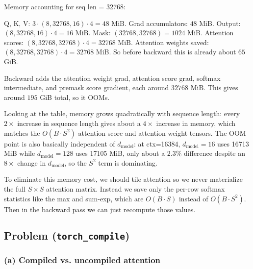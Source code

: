 \documentclass[11pt]{article}
\begin{document}
Memory accounting for seq len = 32768:

Q, K, V: $3 \cdot (8, 32768, 16) \cdot 4 = 48$ MiB.
Grad accumulators: $48$ MiB.
Output: $(8, 32768, 16) \cdot 4 = 16$ MiB.
Mask: $(32768, 32768) = 1024$ MiB.
Attention scores: $(8, 32768, 32768) \cdot 4 = 32768$ MiB.
Attention weights saved: $(8, 32768, 32768) \cdot 4 = 32768$ MiB.
So before backward this is already about $65$ GiB.

Backward adds the attention weight grad, attention score grad, softmax intermediate, and premask score gradient, each around $32768$ MiB. This gives around $195$ GiB total, so it OOMs.

Looking at the table, memory grows quadratically with sequence length: every $2\times$ increase in sequence length gives about a $4\times$ increase in memory, which matches the $O(B \cdot S^2)$ attention score and attention weight tensors. The OOM point is also basically independent of $d_{\text{model}}$: at ctx=16384, $d_{\text{model}}=16$ uses 16713 MiB while $d_{\text{model}}=128$ uses 17105 MiB, only about a 2.3\% difference despite an $8\times$ change in $d_{\text{model}}$, so the $S^2$ term is dominating.

To eliminate this memory cost, we should tile attention so we never materialize the full $S \times S$ attention matrix. Instead we save only the per-row softmax statistics like the max and sum-exp, which are $O(B \cdot S)$ instead of $O(B \cdot S^2)$. Then in the backward pass we can just recompute those values.


\subsection{Problem (\texttt{torch\_compile})}

\subsubsection*{(a) Compiled vs. uncompiled attention}
\end{document}
